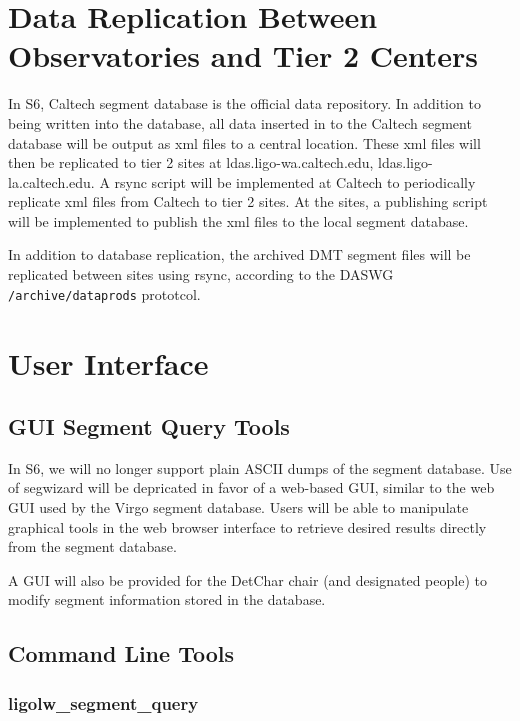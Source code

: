 \section{Data Replication Between Observatories and Tier 2 Centers}

In S6, Caltech segment database is the official data repository. In
addition to being written into the database, all data inserted in to
the Caltech segment database will be output as xml files to a central
location. These xml files will then be replicated to tier 2 sites at
ldas.ligo-wa.caltech.edu, ldas.ligo-la.caltech.edu. A rsync script
will be implemented at Caltech to periodically replicate xml files
from Caltech to tier 2 sites. At the sites, a publishing script will
be implemented to publish the xml files to the local segment database.

In addition to database replication, the archived DMT segment files will be
replicated between sites using rsync, according to the DASWG
\verb|/archive/dataprods| prototcol.


\section{User Interface}

\subsection{GUI Segment Query Tools}

In S6, we will no longer support plain ASCII dumps of the segment database.
Use of segwizard will be depricated in favor of a web-based GUI, similar to
the web GUI used by the Virgo segment database.  Users will be able to
manipulate graphical tools in the web browser interface to retrieve desired
results directly from the segment database. 

A GUI will also be provided for the DetChar chair (and designated people) to
modify segment information stored in the database.

\subsection{Command Line Tools}

\subsubsection{ligolw\_segment\_query}

